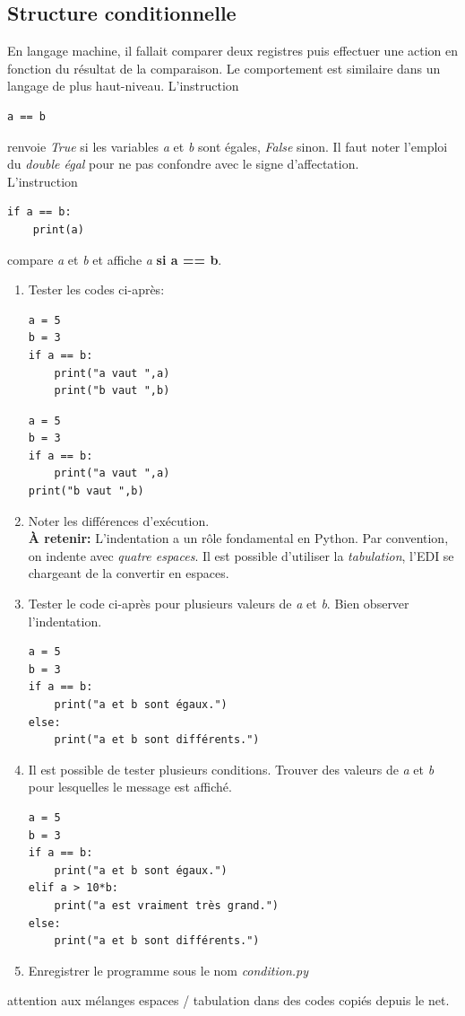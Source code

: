 \documentclass[a4paper,11pt]{article}
\begin{document}
\begin{Form}
\subsection{Structure conditionnelle}
En langage machine, il fallait comparer deux registres puis effectuer une action en fonction du résultat de la comparaison. Le comportement est similaire dans un langage de plus haut-niveau.
L'instruction
\begin{lstlisting}
a == b
\end{lstlisting}
renvoie \emph{True} si les variables \emph{a} et \emph{b} sont égales, \emph{False} sinon. Il faut noter l'emploi du \emph{double égal} pour ne pas confondre avec le signe d'affectation.\\
L'instruction
\begin{lstlisting}
if a == b:
    print(a)
\end{lstlisting}
compare \emph{a} et \emph{b} et affiche \emph{a} \textbf{si a == b}.
\begin{activite}
\begin{enumerate}
\item Tester les codes ci-après:
\begin{lstlisting}
a = 5
b = 3
if a == b:
    print("a vaut ",a)
    print("b vaut ",b)
\end{lstlisting}
\begin{lstlisting}
a = 5
b = 3
if a == b:
    print("a vaut ",a)
print("b vaut ",b)
\end{lstlisting}
\item Noter les différences d'exécution.\\
\textbf{À retenir:} L'indentation a un rôle fondamental en Python. Par convention, on indente avec \emph{quatre espaces}. Il est possible d'utiliser la \emph{tabulation}, l'EDI se chargeant de la convertir en espaces.

\item Tester le code ci-après pour plusieurs valeurs de \emph{a} et \emph{b}. Bien observer l'indentation.
\begin{lstlisting}
a = 5
b = 3
if a == b:
    print("a et b sont égaux.")
else:
    print("a et b sont différents.")
\end{lstlisting}
\item Il est possible de tester plusieurs conditions. Trouver des valeurs de \emph{a} et \emph{b} pour lesquelles le message  est affiché.
\begin{lstlisting}
a = 5
b = 3
if a == b:
    print("a et b sont égaux.")
elif a > 10*b:
    print("a est vraiment très grand.")
else:
    print("a et b sont différents.")
\end{lstlisting}
\item Enregistrer le programme sous le nom \emph{condition.py}
\end{enumerate}
\end{activite}
\begin{commentprof}
attention aux mélanges espaces / tabulation dans des codes copiés depuis le net.
\end{commentprof}

\end{Form}
\end{document}
